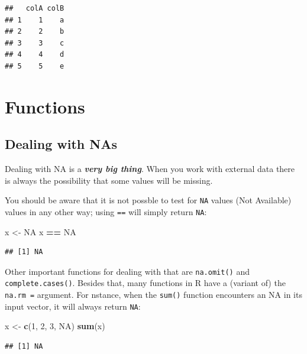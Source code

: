 \documentclass[]{book}
\newenvironment{Shaded}{\begin{snugshade}}{\end{snugshade}}
\newcommand{\DecValTok}[1]{\textcolor[rgb]{0.00,0.00,0.81}{#1}}
\newcommand{\KeywordTok}[1]{\textcolor[rgb]{0.13,0.29,0.53}{\textbf{#1}}}
\newcommand{\NormalTok}[1]{#1}
\newcommand{\OperatorTok}[1]{\textcolor[rgb]{0.81,0.36,0.00}{\textbf{#1}}}
\newcommand{\OtherTok}[1]{\textcolor[rgb]{0.56,0.35,0.01}{#1}}
\newcommand{\StringTok}[1]{\textcolor[rgb]{0.31,0.60,0.02}{#1}}
\begin{document}
\begin{verbatim}
##   colA colB
## 1    1    a
## 2    2    b
## 3    3    c
## 4    4    d
## 5    5    e
\end{verbatim}

\hypertarget{functions-1}{%
\chapter{Functions}\label{functions-1}}

\hypertarget{dealing-with-nas}{%
\section{Dealing with NAs}\label{dealing-with-nas}}

Dealing with NA is a \textbf{\emph{very big thing}}. When you work with external data there is always the possibility that some values will be missing.

You should be aware that it is not possble to test for \texttt{NA} values (Not Available) values in any other way; using \texttt{==} will simply return \texttt{NA}:

\begin{Shaded}
\begin{Highlighting}[]
\NormalTok{x <-}\StringTok{ }\OtherTok{NA}
\NormalTok{x }\OperatorTok{==}\StringTok{ }\OtherTok{NA}
\end{Highlighting}
\end{Shaded}

\begin{verbatim}
## [1] NA
\end{verbatim}

Other important functions for dealing with that are \texttt{na.omit()} and \texttt{complete.cases()}. Besides that, many functions in R have a (variant of) the \texttt{na.rm\ =} argument. For nstance, when the \texttt{sum()} function encounters an NA in its input vector, it will always return \texttt{NA}:

\begin{Shaded}
\begin{Highlighting}[]
\NormalTok{x <-}\StringTok{ }\KeywordTok{c}\NormalTok{(}\DecValTok{1}\NormalTok{, }\DecValTok{2}\NormalTok{, }\DecValTok{3}\NormalTok{, }\OtherTok{NA}\NormalTok{)}
\KeywordTok{sum}\NormalTok{(x)}
\end{Highlighting}
\end{Shaded}

\begin{verbatim}
## [1] NA
\end{verbatim}
\end{document}

